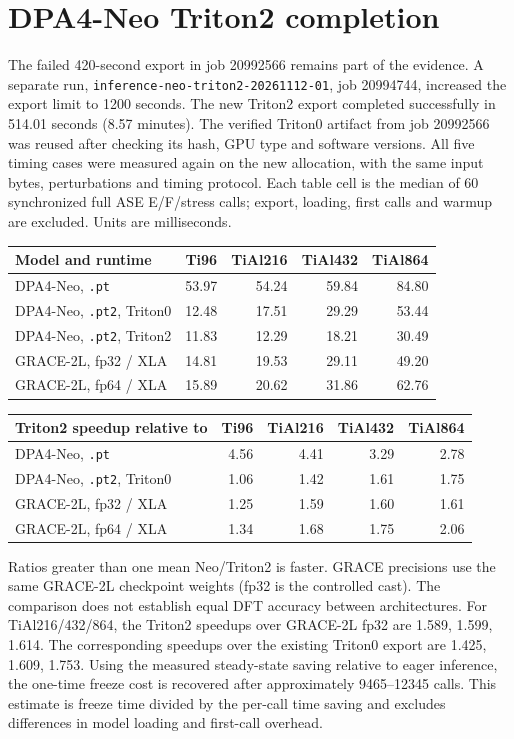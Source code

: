 \section*{DPA4-Neo Triton2 completion}
The failed 420-second export in job 20992566 remains part of the evidence.
A separate run, \texttt{inference-neo-triton2-20261112-01}, job 20994744,
increased the export limit to 1200 seconds.
The new Triton2 export completed successfully in 514.01 seconds (8.57 minutes).
The verified Triton0 artifact from job 20992566 was reused after checking its hash,
GPU type and software versions. All five timing cases were measured again on the
new allocation, with the same input bytes, perturbations and timing protocol.
Each table cell is the median of 60 synchronized full ASE E/F/stress calls;
export, loading, first calls and warmup are excluded. Units are milliseconds.
\begin{center}\small
\begin{tabular}{@{}lrrrr@{}}
\toprule
Model and runtime & Ti96 & TiAl216 & TiAl432 & TiAl864 \\
\midrule
DPA4-Neo, \texttt{.pt} & 53.97 & 54.24 & 59.84 & 84.80 \\
DPA4-Neo, \texttt{.pt2}, Triton0 & 12.48 & 17.51 & 29.29 & 53.44 \\
DPA4-Neo, \texttt{.pt2}, Triton2 & 11.83 & 12.29 & 18.21 & 30.49 \\
GRACE-2L, fp32 / XLA & 14.81 & 19.53 & 29.11 & 49.20 \\
GRACE-2L, fp64 / XLA & 15.89 & 20.62 & 31.86 & 62.76 \\
\bottomrule
\end{tabular}\end{center}
\begin{center}\small
\begin{tabular}{@{}lrrrr@{}}
\toprule
Triton2 speedup relative to & Ti96 & TiAl216 & TiAl432 & TiAl864 \\
\midrule
DPA4-Neo, \texttt{.pt} & 4.56 & 4.41 & 3.29 & 2.78 \\
DPA4-Neo, \texttt{.pt2}, Triton0 & 1.06 & 1.42 & 1.61 & 1.75 \\
GRACE-2L, fp32 / XLA & 1.25 & 1.59 & 1.60 & 1.61 \\
GRACE-2L, fp64 / XLA & 1.34 & 1.68 & 1.75 & 2.06 \\
\bottomrule
\end{tabular}\end{center}
Ratios greater than one mean Neo/Triton2 is faster. GRACE precisions use
the same GRACE-2L checkpoint weights (fp32 is the controlled cast). The
comparison does not establish equal DFT accuracy between architectures.
For TiAl216/432/864, the Triton2 speedups over GRACE-2L fp32 are 1.589, 1.599, 1.614.
The corresponding speedups over the existing Triton0 export are 1.425, 1.609, 1.753.
Using the measured steady-state saving relative to eager inference, the one-time
freeze cost is recovered after approximately 9465--12345 calls.
This estimate is freeze time divided by the per-call time saving and excludes
differences in model loading and first-call overhead.
